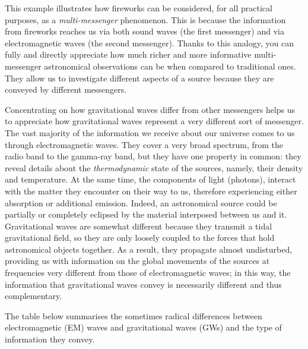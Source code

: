 This example illustrates how fireworks can be considered, for all practical purposes, as
a \emph{multi-messenger} phenomenon. This is because the information from fireworks
reaches us via both sound waves (the first messenger) and via electromagnetic waves (the
second messenger). Thanks to this analogy, you can fully and directly appreciate how
much richer and more informative multi-messenger astronomical observations can be when
compared to traditional ones. They allow us to investigate different aspects of a source
because they are conveyed by different messengers.

Concentrating on how gravitational waves differ from other messengers helps us to
appreciate how gravitational waves represent a very different sort of messenger. The
vast majority of the information we receive about our universe comes to us through
electromagnetic waves. They cover a very broad spectrum, from the
radio band to the gamma-ray band, but they have one property in common: they reveal
details about the \emph{thermodynamic} state of the sources, namely,
their density and temperature. At the same time, the components of light (photons),
interact with the matter they encounter on their way to us, therefore experiencing
either absorption or additional emission. Indeed, an astronomical source could be
partially or completely eclipsed by the material interposed between us and it.
Gravitational waves are somewhat different because they transmit a tidal gravitational
field, so they are only loosely coupled to the forces that hold astronomical objects
together. As a result, they propagate almost undisturbed, providing us with information
on the global movements of the sources at frequencies very different from those of
electromagnetic waves; in this way, the information that gravitational waves convey is
necessarily different and thus complementary.

The table below summarises the sometimes radical differences between electromagnetic
(EM) waves and gravitational waves (GWs) and the type of information they convey.



